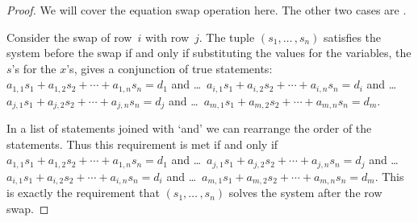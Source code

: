 \begin{proof}
We will cover the equation swap operation here. 
The other two
cases are .

Consider the swap of row~$i$ with row~$j$.
The tuple \( (s_1,\ldots\,,s_n) \)
satisfies the system before the swap 
if and only if substituting the values for the
variables, the $s$'s for the $x$'s, gives a conjunction of true statements:
$a_{1,1}s_1+a_{1,2}s_2+\cdots+a_{1,n}s_n=d_1$
and \ldots\ 
$a_{i,1}s_1+a_{i,2}s_2+\cdots+a_{i,n}s_n=d_i$
and \ldots\  $a_{j,1}s_1+a_{j,2}s_2+\cdots+a_{j,n}s_n=d_j$
and \ldots\  $a_{m,1}s_1+a_{m,2}s_2+\cdots+a_{m,n}s_n=d_m$.

In a list of statements joined with `and' we can  
rearrange the order of the statements. 
Thus
this requirement is met if and only if
$a_{1,1}s_1+a_{1,2}s_2+\cdots+a_{1,n}s_n=d_1$
and \ldots\  $a_{j,1}s_1+a_{j,2}s_2+\cdots+a_{j,n}s_n=d_j$
and \ldots\  $a_{i,1}s_1+a_{i,2}s_2+\cdots+a_{i,n}s_n=d_i$
and \ldots\  $a_{m,1}s_1+a_{m,2}s_2+\cdots+a_{m,n}s_n=d_m$.
This is exactly the requirement that \( (s_1,\ldots\,,s_n) \) 
solves the system after the row swap.
\end{proof}

